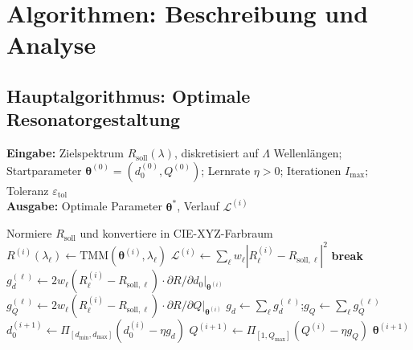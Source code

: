 ﻿\documentclass[a4paper,12pt]{article}
\theoremstyle{definition}
\newcommand{\vect}[1]{\bm{#1}}
\begin{document}
	\section{Algorithmen: Beschreibung und Analyse}
	\label{sec:algorithmen}
	
	\subsection{Hauptalgorithmus: Optimale Resonatorgestaltung}
	
	\begin{algorithm}[htb]
		\caption{Optimale Resonatorgestaltung durch adjungierten Gradientenabstieg}
		\label{alg:hauptalgorithmus}
		\textbf{Eingabe:} Zielspektrum $R_\mathrm{soll}(\lambda)$, diskretisiert
		auf $\Lambda$ Wellenlängen; Startparameter $\vect{\theta}^{(0)} = (d_0^{(0)}, Q^{(0)})$;
		Lernrate $\eta > 0$; Iterationen $I_\mathrm{max}$; Toleranz $\varepsilon_\mathrm{tol}$\\
		\textbf{Ausgabe:} Optimale Parameter $\vect{\theta}^*$, Verlauf $\mathcal{L}^{(i)}$
		\begin{algorithmic}[1]
			\State Normiere $R_\mathrm{soll}$ und konvertiere in CIE-XYZ-Farbraum
			 
			\State $R^{(i)}(\lambda_\ell) \gets \mathrm{TMM}(\vect{\theta}^{(i)}, \lambda_\ell)$
			\EndFor
			\State $\mathcal{L}^{(i)} \gets \sum_\ell w_\ell |R^{(i)}_\ell - R_{\mathrm{soll},\ell}|^2$
			\State \textbf{break} 
			\EndIf
			 
			\State $g_d^{(\ell)} \gets 2w_\ell(R^{(i)}_\ell - R_{\mathrm{soll},\ell})
			\cdot \partial R/\partial d_0|_{\vect{\theta}^{(i)}}$
			\State $g_Q^{(\ell)} \gets 2w_\ell(R^{(i)}_\ell - R_{\mathrm{soll},\ell})
			\cdot \partial R/\partial Q|_{\vect{\theta}^{(i)}}$
			\EndFor
			\State $g_d \gets \sum_\ell g_d^{(\ell)}$;\quad $g_Q \gets \sum_\ell g_Q^{(\ell)}$
			\State $d_0^{(i+1)} \gets \Pi_{[d_\mathrm{min}, d_\mathrm{max}]}\!\left(d_0^{(i)} - \eta g_d\right)$
			\State $Q^{(i+1)} \gets \Pi_{[1, Q_\mathrm{max}]}\!\left(Q^{(i)} - \eta g_Q\right)$
			\EndFor
			\State \Return $\vect{\theta}^{(i+1)}$
		\end{algorithmic}
	\end{algorithm}
	
\end{document}
